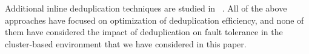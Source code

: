 Additional inline deduplication techniques are studied in ~\cite{sparseindex09,Guo2011,idedup}. 
All of the above approaches have focused on optimization of deduplication
efficiency, and none of them have considered the impact
of deduplication on fault tolerance in the cluster-based environment that we have considered
in this paper.






